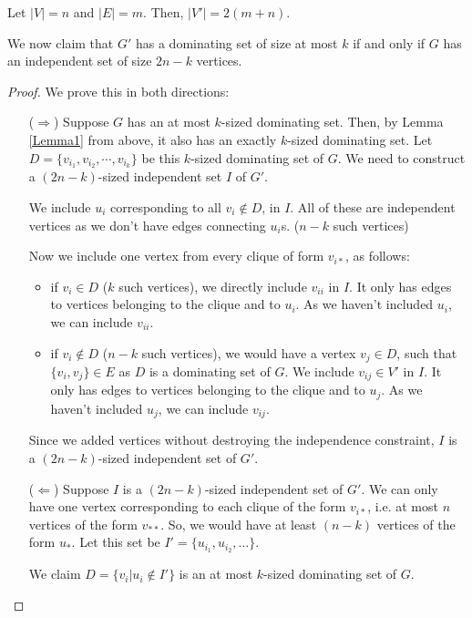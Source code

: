 \documentclass[11pt, fleqn]{article}
\begin{document}
\begin{itemize}
    Let $|V| = n$ and $|E| = m$. Then, $|V'| = 2(m+n)$.
    
    We now claim that $G'$ has a dominating set of size at most $k$ if and only if $G$ has an independent set of size $2n - k$ vertices.
    \begin{proof}
        We prove this in both directions:
        \begin{itemize}
            \item[($\Rightarrow$)] Suppose $G$ has an at most $k$-sized dominating set. Then, by Lemma \ref{Lemma1} from above, it also has an exactly $k$-sized dominating set. Let $D = \{v_{i_1}, v_{i_2}, \cdots, v_{i_k}\}$ be this $k$-sized dominating set of $G$. We need to construct a $(2n - k)$-sized independent set $I$ of $G'$.
            
            We include $u_i$ corresponding to all $v_i \notin D$, in $I$. All of these are independent vertices as we don't have edges connecting $u_i$s. ($n - k$ such vertices)
            
            Now we include one vertex from every clique of form $v_{i*}$, as follows:
            \begin{itemize}[noitemsep]
                \item if $v_i \in D$ ($k$ such vertices), we directly include $v_{ii}$ in $I$. It only has edges to vertices belonging to the clique and to $u_i$. As we haven't included $u_i$, we can include $v_{ii}$.
                \item if $v_i \notin D$ ($n-k$ such vertices), we would have a vertex $v_j \in D$, such that $\{v_i, v_j\} \in E$ as $D$ is a dominating set of $G$. We include $v_{ij}\in V'$ in $I$. It only has edges to vertices belonging to the clique and to $u_j$. As we haven't included $u_j$, we can include $v_{ij}$.
            \end{itemize}
            
            Since we added vertices without destroying the independence constraint, $I$ is a $(2n - k)$-sized independent set of $G'$.
            \item[($\Leftarrow$)] Suppose $I$ is a $(2n - k)$-sized independent set of $G'$. We can only have one vertex corresponding to each clique of the form $v_{i*}$, i.e. at most $n$ vertices of the form $v_{**}$. So, we would have at least $(n-k)$ vertices of the form $u_{*}$. Let this set be $I' = \{u_{i_1}, u_{i_2}, \dots \}$.
            
            We claim $D = \{v_i | u_i \notin I'\}$ is an at most $k$-sized dominating set of $G$.
            

\end{itemize}
\end{proof}
\end{itemize}
\end{document}
